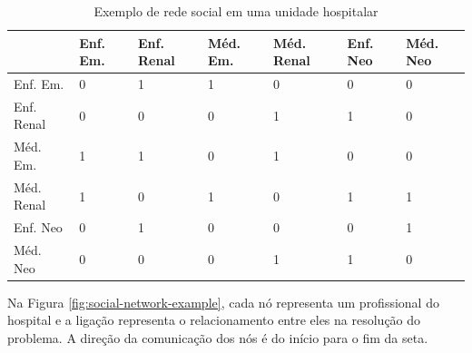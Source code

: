 \begin{table}[htbp]
\centering
\caption{Exemplo de rede social em uma unidade hospitalar}
\label{table:social-network-example}
\begin{tabular}{|l|l|l|l|l|l|l|}
\hline
                                      & Enf. Em. & Enf. Renal & Méd. Em. & Méd. Renal & Enf. Neo & Méd. Neo \\ \hline
Enf. Em.                 & 0                     & 1                                   & 1                 & 0                       & 0                                     & 0                                 \\ \hline
Enf. Renal   & 0                     & 0                                   & 0                 & 1                       & 1                                     & 0                                 \\ \hline
Méd. Em.                     & 1                     & 1                                   & 0                 & 1                       & 0                                     & 0                                 \\ \hline
Méd. Renal               & 1                     & 0                                   & 1                 & 0                       & 1                                     & 1                                 \\ \hline
Enf. Neo & 0                     & 1                                   & 0                 & 0                       & 0                                     & 1                                 \\ \hline
Méd. Neo     & 0                     & 0                                   & 0                 & 1                       & 1                                     & 0                                 \\ \hline
\end{tabular}
\end{table}

Na Figura \ref{fig:social-network-example}, cada nó representa um profissional do hospital e a ligação representa o relacionamento entre eles na resolução do problema. A direção da comunicação dos nós é do início para o fim da seta.

